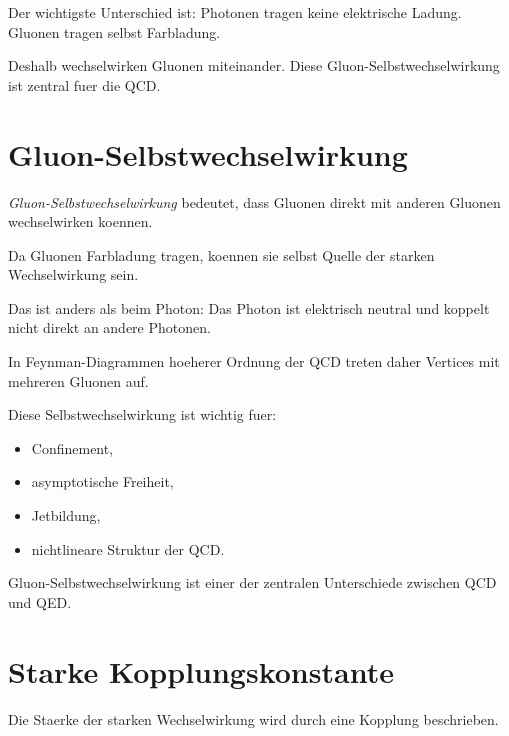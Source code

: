 \begin{conceptbox}
Der wichtigste Unterschied ist:
Photonen tragen keine elektrische Ladung.
Gluonen tragen selbst Farbladung.

Deshalb wechselwirken Gluonen miteinander.
Diese Gluon-Selbstwechselwirkung ist zentral fuer die QCD.
\end{conceptbox}

\section{Gluon-Selbstwechselwirkung}

\begin{definitionbox}
\emph{Gluon-Selbstwechselwirkung} bedeutet, dass Gluonen direkt mit anderen Gluonen
wechselwirken koennen.
\end{definitionbox}

\begin{conceptbox}
Da Gluonen Farbladung tragen, koennen sie selbst Quelle der starken Wechselwirkung
sein.

Das ist anders als beim Photon:
Das Photon ist elektrisch neutral und koppelt nicht direkt an andere Photonen.
\end{conceptbox}

\begin{notebox}
In Feynman-Diagrammen hoeherer Ordnung der QCD treten daher Vertices mit mehreren
Gluonen auf.

Diese Selbstwechselwirkung ist wichtig fuer:
\begin{itemize}
    \item Confinement,
    \item asymptotische Freiheit,
    \item Jetbildung,
    \item nichtlineare Struktur der QCD.
\end{itemize}
\end{notebox}

\begin{examtipbox}
Gluon-Selbstwechselwirkung ist einer der zentralen Unterschiede zwischen QCD und QED.
\end{examtipbox}

\section{Starke Kopplungskonstante}

Die Staerke der starken Wechselwirkung wird durch eine Kopplung beschrieben.

